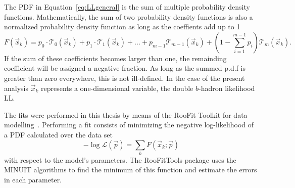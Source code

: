 
The PDF in Equation~\ref{eq:LLgeneral} is the sum  of multiple probability density functions. Mathematically, the sum of two probability density functions is also a normalized probability density function as long as the coeffients add up to 1 
% 
\begin{equation} 
F(\vec{x}_k) = p_0 \cdot \mathcal{T}_0(\vec{x}_k) + p_1 \cdot \mathcal{T}_1(\vec{x}_k)+...+p_{m-1}\mathcal{T}_{m-1}(\vec{x}_k)+ (1-\sum^{m-1}_{i=1}p_i) \mathcal{T}_m(\vec{x}_k).
\end{equation}
%
If the sum of these coefficients becomes larger than one, the remainding coefficient will be assigned a negative fraction. As long as the summed p.d.f is greater than zero everywhere, this is not ill-defined. %
In the case of the present analysis $\vec{x}_k$ represents a one-dimensional variable, the double $b$-hadron likelihood LL. 

The fits were performed in this thesis by means of the RooFit Toolkit for data modelling~\cite{RooFit}. Performing a fit consists of minimizing the negative log-likelihood of a PDF calculated over the data set %
%
\begin{equation}
-\log \mathcal{L} (\vec{p}) = \sum_k F(\vec{x}_k;\vec{p})
\end{equation}
%
with respect to the model's parameters.  The RooFitTools package uses the MINUIT\cite{MINUIT} algorithms to find the minimum of this function and estimate the errors in each parameter.  %



